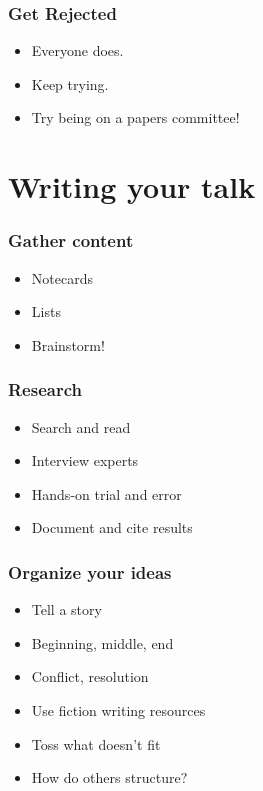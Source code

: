 \documentclass{beamer}
\begin{document}
\begin{frame}[fragile]
\frametitle{Get Rejected}
\begin{itemize}[<+(1)->]
\item Everyone does.
\item Keep trying.
\item Try being on a papers committee!
\end{itemize}
\end{frame}

\section{Writing your talk}

\begin{frame}[fragile]
\tableofcontents[currentsection]
\end{frame}

\begin{frame}[fragile]
\frametitle{Gather content}
\begin{itemize}[<+(1)->]
\item Notecards
\item Lists
\item Brainstorm!
\end{itemize}
\end{frame}

\begin{frame}[fragile]
\frametitle{Research}
\begin{itemize}[<+(1)->]
\item Search and read
\item Interview experts
\item Hands-on trial and error
\item Document and cite results
\end{itemize}
\end{frame}

\begin{frame}[fragile]
\frametitle{Organize your ideas}
\begin{itemize}[<+(1)->]
\item Tell a story
\item Beginning, middle, end
\item Conflict, resolution
\item Use fiction writing resources
\item Toss what doesn't fit
\item How do others structure$?$
\end{itemize}
\end{frame}
\end{document}

